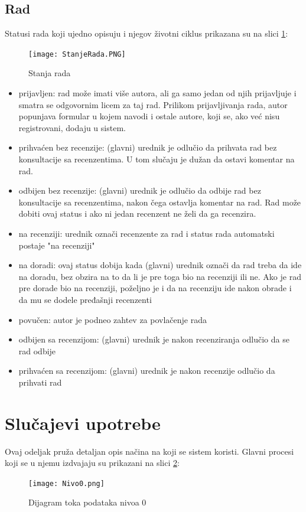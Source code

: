 \documentclass[a4paper]{article}
\begin{document}
\subsection{Rad}
\label{subsection:rad}
    Statusi rada koji ujedno opisuju i njegov životni ciklus prikazana su na slici \ref{fig:stanjarada}:
    \begin{figure}[ht!]
    \begin{center}
    \texttt{[image: StanjeRada.PNG]}
    \end{center}
    \caption{Stanja rada \cite{alex} \cite{vparadigm}}
    \label{fig:stanjarada}
    \end{figure}
    \begin{itemize}
        \item prijavljen: rad može imati više autora, ali ga samo jedan od njih prijavljuje i smatra se odgovornim licem za taj rad. Prilikom prijavljivanja rada, autor popunjava formular u kojem navodi i ostale autore, koji se, ako već nisu registrovani, dodaju u sistem.
        \item prihvaćen bez recenzije: (glavni) urednik je odlučio da prihvata rad bez konsultacije sa recenzentima. U tom slučaju je dužan da ostavi komentar na rad.
        \item odbijen bez recenzije: (glavni) urednik je odlučio da odbije rad bez konsultacije sa recenzentima, nakon čega ostavlja komentar na rad. Rad može dobiti ovaj status i ako ni jedan recenzent ne želi da ga recenzira.
        \item na recenziji: urednik označi recenzente za rad i status rada automatski postaje "na recenziji"
        \item na doradi: ovaj status dobija kada  (glavni) urednik označi da rad treba da ide na doradu, bez obzira na to da li je pre toga bio na recenziji ili ne. Ako je rad pre dorade bio na recenziji, poželjno je i da na recenziju ide nakon obrade i da mu se dodele pređašnji recenzenti
        \item povučen: autor je podneo zahtev za povlačenje rada
        \item odbijen sa recenzijom: (glavni) urednik je nakon recenziranja odlučio da se rad odbije
        \item prihvaćen sa recenzijom: (glavni) urednik je nakon recenzije odlučio da prihvati rad
    \end{itemize}
    
\newpage

\section{Slučajevi upotrebe}
\label{section:slucajeviupotrebe}
Ovaj odeljak pruža detaljan opis načina na koji se sistem koristi. Glavni procesi koji se u njemu izdvajaju su prikazani na slici \ref{fig:nivo0}:
\begin{figure}[h!]
   \begin{center}
    \texttt{[image: Nivo0.png]}
    \end{center}
    \caption{Dijagram toka podataka nivoa 0 \cite{smalkov} \cite{vparadigm}}
    \label{fig:nivo0}
\end{figure}
\end{document}

